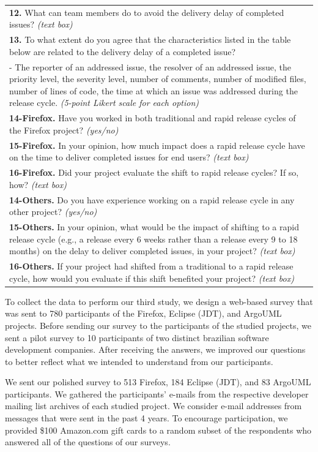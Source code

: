 \begin{table}[t!]
\begin{tabular}{p{}}
			\hline 
			\textbf{12.} What can team members do to avoid the delivery delay of completed
			issues? {\em (text box)}\tabularnewline
			\textbf{13.} To what extent do you agree that the characteristics listed in
			the table below are related to the delivery delay of a
			completed issue?\\
			- The reporter of an addressed issue, the resolver of an
			addressed issue, the priority level, the severity level,
			number of comments, number of modified files, number of
			lines of code, the time at which an issue was addressed
			during the release cycle.
			{\em (5-point Likert scale for each option)}\tabularnewline
			\hline 
			\textbf{14-Firefox.} Have you worked in both traditional and rapid release cycles of
			the Firefox project? {\em (yes/no)}\tabularnewline
			\textbf{15-Firefox.} In your opinion, how much impact does a rapid release cycle have
			on the time to deliver completed issues for end users?
			{\em (text box)}\tabularnewline
			\textbf{16-Firefox.} Did your project evaluate the shift to rapid release cycles? If
			so, how? {\em (text box)}\tabularnewline
			\textbf{14-Others.} Do you have experience working on a
			rapid release cycle in any other project? {\em (yes/no)}\tabularnewline
			\textbf{15-Others.} In your opinion, what would be the
			impact of shifting to a rapid release cycle (e.g., a
			release every 6 weeks rather than a release every 9 to
			18 months) on the delay to deliver completed issues, in
			your project? {\em (text box)}\tabularnewline
			\textbf{16-Others.} If your project had shifted from a
			traditional to a rapid release cycle, how would you
			evaluate if this shift benefited your project? {\em (text box)}
		\end{tabular}
\end{table}

To collect the data to perform our third study, we design a web-based survey
that was sent to 780 participants of the Firefox, Eclipse (JDT), and ArgoUML
projects. Before sending our survey to the participants of the studied projects,
we sent a pilot survey to 10 participants of two distinct brazilian software
development companies. After receiving the answers, we improved our questions to
better reflect what we intended to understand from our participants.

We sent our polished survey to 513 Firefox, 184 Eclipse (JDT), and 83 ArgoUML
participants. We gathered the participants' e-mails from the respective
developer mailing list archives of each studied project. We consider e-mail
addresses from messages that were sent in the past 4 years. To encourage
participation, we provided \$100 Amazon.com gift cards to a random subset of the
respondents who answered all of the questions of our surveys.

